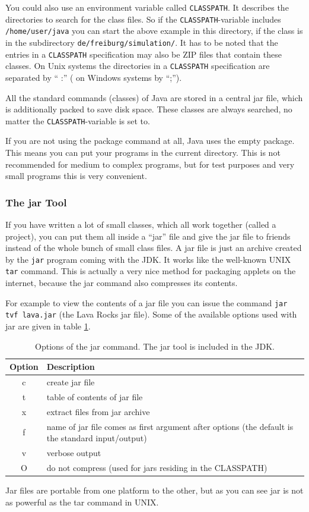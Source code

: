 You could also use an environment variable called \verb|CLASSPATH|. It
describes the directories to search for the class files. So if the
\verb|CLASSPATH|-variable includes \verb|/home/user/java| you can
start the above example in this directory, if the class is in the 
subdirectory  \verb|de/freiburg/simulation/|. It has to be noted that
the entries in a \verb|CLASSPATH| specification may also be ZIP files
that contain these classes. On Unix systems the directories in a
\verb|CLASSPATH| specification are separated by `` :'' ( on Windows systems
by ``;'').


All the standard commands (classes) of Java are stored in a central jar
file, which is additionally packed to save disk space. These classes
are always searched, no matter the \verb|CLASSPATH|-variable is set to.

If you are not using the package command at all, Java uses the empty 
package. This means you can put your programs in the current directory.
This is not recommended for medium to complex programs, but for
test purposes and very small programs this is very convenient.

\subsubsection{The jar Tool}
If you have written a lot of small classes, which all work together
(called a project), you
can put them all inside a ``jar'' file and give the jar file
to friends instead of the whole bunch of small class files.
A jar file is just an archive created by the \verb|jar| program 
coming with the JDK. It works like the well-known UNIX \verb|tar|
command. This is actually a very nice method for packaging
applets on the internet, because the jar command also compresses
its contents. 

For example to view the contents of a jar file you can issue the command
\verb|jar tvf lava.jar| (the Lava Rocks jar file). Some of the
available options used with jar are given in table \ref{tab:JarOptions}.
\begin{table}[htbp]
  \begin{center}
    \begin{tabular}{cp{}}
      Option & Description \\\hline
      c & create jar file\\
      t & table of contents of jar file\\
      x & extract files from jar archive\\
      f & name of jar file comes as first argument after options (the
          default is the standard input/output) \\
      v & verbose output \\
      O & do not compress (used for jars residing in the CLASSPATH)\\
    \end{tabular}
    \caption{Options of the jar command. The jar tool is included in the JDK.}
    \label{tab:JarOptions}
  \end{center}
\end{table}
Jar files are portable from one platform to the other, but as you can 
see jar is not as powerful as the tar command in UNIX.


